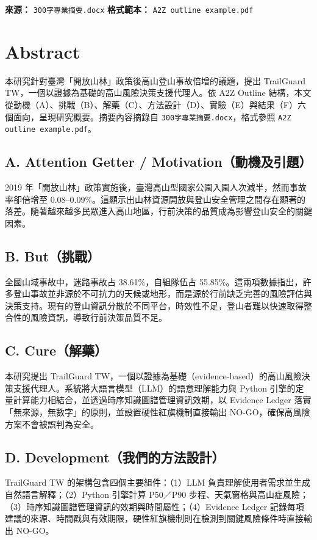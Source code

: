 \documentclass[12pt,a4paper]{article}
\begin{document}
\maketitle

\noindent\textbf{來源：} \texttt{300字專業摘要.docx} \quad
\textbf{格式範本：} \texttt{A2Z outline example.pdf}

\vspace{1em}

\section{Abstract}
本研究針對臺灣「開放山林」政策後高山登山事故倍增的議題，提出 TrailGuard TW，一個以證據為基礎的高山風險決策支援代理人。依 A2Z Outline 結構，本文從動機（A）、挑戰（B）、解藥（C）、方法設計（D）、實驗（E）與結果（F）六個面向，呈現研究概要。摘要內容摘錄自 \texttt{300字專業摘要.docx}，格式參照 \texttt{A2Z outline example.pdf}。

\subsection*{A. Attention Getter / Motivation（動機及引題）}
2019 年「開放山林」政策實施後，臺灣高山型國家公園入園人次減半，然而事故率卻倍增至 0.08–0.09\%。這顯示出山林資源開放與登山安全管理之間存在顯著的落差。隨著越來越多民眾進入高山地區，行前決策的品質成為影響登山安全的關鍵因素。

\subsection*{B. But（挑戰）}
全國山域事故中，迷路事故占 38.61\%，自組隊伍占 55.85\%。這兩項數據指出，許多登山事故並非源於不可抗力的天候或地形，而是源於行前缺乏完善的風險評估與決策支持。現有的登山資訊分散於不同平台，時效性不足，登山者難以快速取得整合性的風險資訊，導致行前決策品質不足。

\subsection*{C. Cure（解藥）}
本研究提出 TrailGuard TW，一個以證據為基礎（evidence-based）的高山風險決策支援代理人。系統將大語言模型（LLM）的語意理解能力與 Python 引擎的定量計算能力相結合，並透過時序知識圖譜管理資訊效期，以 Evidence Ledger 落實「無來源，無數字」的原則，並設置硬性紅旗機制直接輸出 NO-GO，確保高風險方案不會被誤判為安全。

\subsection*{D. Development（我們的方法設計）}
TrailGuard TW 的架構包含四個主要組件：（1）LLM 負責理解使用者需求並生成自然語言解釋；（2）Python 引擎計算 P50／P90 步程、天氣窗格與高山症風險；（3）時序知識圖譜管理資訊的效期與時間屬性；（4）Evidence Ledger 記錄每項建議的來源、時間戳與有效期限，硬性紅旗機制則在檢測到關鍵風險條件時直接輸出 NO-GO。
\end{document}
